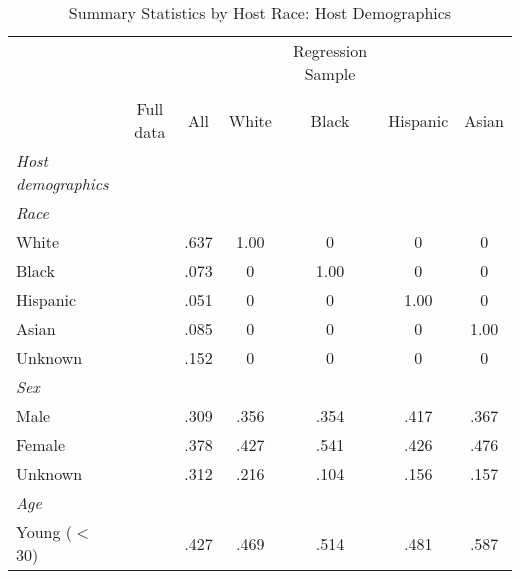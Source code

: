{
	\begin{longtable}{l*{6}{c}}
		\caption{Summary Statistics by Host Race: Host Demographics}\\
		
		\hline
		&\multicolumn{1}{c}{}&\multicolumn{1}{c}{}&\multicolumn{1}{c}{}&\multicolumn{1}{c}{Regression Sample}&\multicolumn{1}{c}{}&\multicolumn{1}{c}{}\\
		\cline{3-7}\\
			&\multicolumn{1}{c}{Full data}&\multicolumn{1}{c}{All}&\multicolumn{1}{c}{White}&\multicolumn{1}{c}{Black}&\multicolumn{1}{c}{Hispanic}&\multicolumn{1}{c}{Asian}\\
		\hline\hline
		
		
		\textit{Host demographics} \\
		\hline 
		\textit{Race} \\
		\hspace{3mm}White     & &      .637         &       1.00         &      0         &      0 	& 		0         \\
		\hspace{3mm}Black     &  &    .073       &       0         &      1.00         &      0 	& 		0         \\
		\hspace{3mm}Hispanic     & &      .051         &       0         &      0         &      1.00 	& 		0         \\
		\hspace{3mm}Asian     &   &   .085      &       0         &      0         &      0 	& 		1.00         \\
		\hspace{3mm}Unknown     & &      .152         &       0         &      0         &      0 	& 		0         \\
		[1em]
		\textit{Sex} \\
		\hspace{3mm}Male     & &      .309         &       .356         &      .354         &      .417 	& 		.367        \\
		\hspace{3mm}Female     & &      .378         &       .427        &      .541         &      .426 	& 		.476         \\
		\hspace{3mm}Unknown   &  &      .312         &       .216         &      .104         &      .156 	& 		.157         \\
		[1em]
		\textit{Age} \\
		\hspace{3mm}Young ($<$ 30)     & &      .427         &       .469         &      .514        &      .481 	& 		.587         \\

\end{longtable}}
